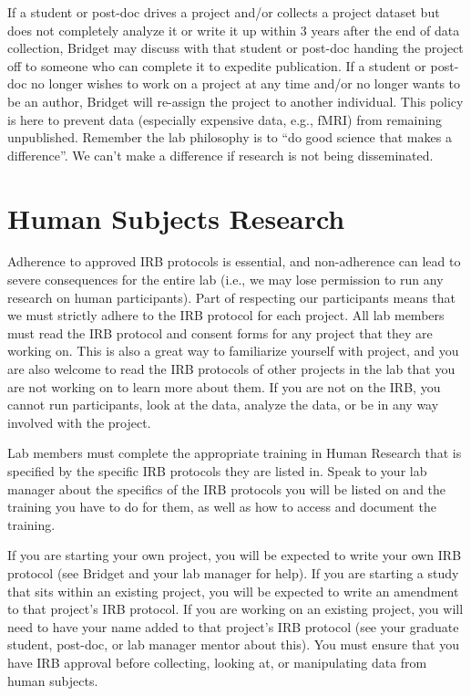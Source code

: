 \documentclass[]{book}
\begin{document}
If a student or post-doc drives a project and/or collects a project dataset but does not completely analyze it or write it up within 3 years after the end of data collection, Bridget may discuss with that student or post-doc handing the project off to someone who can complete it to expedite publication. If a student or post-doc no longer wishes to work on a project at any time and/or no longer wants to be an author, Bridget will re-assign the project to another individual. This policy is here to prevent data (especially expensive data, e.g., fMRI) from remaining unpublished. Remember the lab philosophy is to ``do good science that makes a difference''. We can't make a difference if research is not being disseminated.

\hypertarget{human-subjects-research}{%
\section{Human Subjects Research}\label{human-subjects-research}}

Adherence to approved IRB protocols is essential, and non-adherence can lead to severe consequences for the entire lab (i.e., we may lose permission to run any research on human participants). Part of respecting our participants means that we must strictly adhere to the IRB protocol for each project. All lab members must read the IRB protocol and consent forms for any project that they are working on. This is also a great way to familiarize yourself with project, and you are also welcome to read the IRB protocols of other projects in the lab that you are not working on to learn more about them. If you are not on the IRB, you cannot run participants, look at the data, analyze the data, or be in any way involved with the project.

Lab members must complete the appropriate training in Human Research that is specified by the specific IRB protocols they are listed in. Speak to your lab manager about the specifics of the IRB protocols you will be listed on and the training you have to do for them, as well as how to access and document the training.

If you are starting your own project, you will be expected to write your own IRB protocol (see Bridget and your lab manager for help). If you are starting a study that sits within an existing project, you will be expected to write an amendment to that project's IRB protocol. If you are working on an existing project, you will need to have your name added to that project's IRB protocol (see your graduate student, post-doc, or lab manager mentor about this). You must ensure that you have IRB approval before collecting, looking at, or manipulating data from human subjects.
\end{document}
